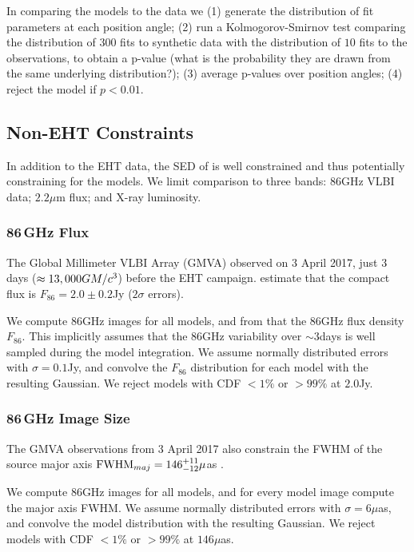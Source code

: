 In comparing the models to the data we (1) generate the distribution of fit parameters at each position angle; (2) run a Kolmogorov-Smirnov test comparing the distribution of $300$ fits to synthetic data with the distribution of $10$ fits to the observations, to obtain a p-value (what is the probability they are drawn from the same underlying distribution?); (3) average p-values over position angles; (4) reject the model if $p < 0.01$.

\subsection{Non-EHT Constraints}

In addition to the EHT data, the SED of \sgra is well constrained  and thus potentially constraining for the models.  We limit comparison to three bands: 86GHz VLBI data; $2.2\mu$m flux; and X-ray luminosity.  

\subsubsection{86\,GHz Flux}

The Global Millimeter VLBI Array (GMVA) observed \sgra on 3 April 2017, just 3 days ($\approx 13,000 GM/c^3$) before the EHT campaign.  \cite{2019ApJ...871...30I} estimate that the compact flux is $F_{86}=2.0 \pm 0.2$Jy ($2\sigma$ errors).  

We compute 86GHz images for all models, and from that the 86GHz flux density $F_{86}$.  This implicitly assumes that the 86GHz variability over $\sim 3$days is well sampled during the model integration.  We assume normally distributed errors with $\sigma = 0.1$Jy, and convolve the $F_{86}$ distribution for each model with the resulting Gaussian.  We reject models with CDF $< 1\%$ or $> 99\%$ at $2.0$Jy.
\subsubsection{86\,GHz Image Size}

The GMVA observations from 3 April 2017 also constrain the FWHM of the source major axis ${\rm FWHM}_{maj} = 146^{+11}_{-12}\mu$as \citep[95\% confidence][]{2021ApJ...915...99I}.

We compute 86GHz images for all models, and for every model image compute the major axis FWHM.  We assume normally distributed errors with $\sigma = 6\mu$as, and convolve the model distribution with the resulting Gaussian.  We reject models with CDF $< 1\%$ or $> 99\%$ at $146\mu$as.

